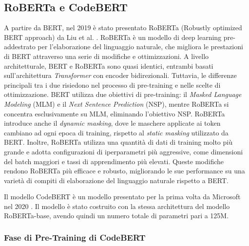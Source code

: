 \documentclass[../../Thesis.tex]{subfiles}
\begin{document}
\subsection{RoBERTa e CodeBERT}
A partire da BERT, nel 2019 è stato presentato RoBERTa (Robustly optimized BERT approach) da Liu et al. \cite{RoBERTa}. RoBERTa è un modello di deep learning pre-addestrato per l'elaborazione del linguaggio naturale, che migliora le prestazioni di BERT attraverso una serie di modifiche e ottimizzazioni. A livello architetturale, BERT e RoBERTa sono quasi identici, entrambi basati sull'architettura \textit{Transformer} con encoder bidirezionali. Tuttavia, le differenze principali tra i due risiedono nel processo di pre-training e nelle scelte di ottimizzazione. BERT utilizza due obiettivi di pre-training: il \textit{Masked Language Modeling} (MLM) e il \textit{Next Sentence Prediction} (NSP), mentre RoBERTa si concentra esclusivamente su MLM, eliminando l'obiettivo NSP. RoBERTa introduce anche il \textit{dynamic masking}, dove le maschere applicate ai token cambiano ad ogni epoca di training, rispetto al \textit{static masking} utilizzato da BERT. Inoltre, RoBERTa utilizza una quantità di dati di training molto più grande e adotta configurazioni di iperparametri più aggressive, come dimensioni del batch maggiori e tassi di apprendimento più elevati. Queste modifiche rendono RoBERTa più efficace e robusto, migliorando le sue performance su una varietà di compiti di elaborazione del linguaggio naturale rispetto a BERT.


Il modello CodeBERT è un modello presentato per la prima volta da Microsoft nel 2020 \cite{CodeBERT}. Il modello è stato costruito con la stessa architettura del modello RoBERTa-base, avendo quindi un numero totale di parametri pari a 125M. 
 

\subsubsection{Fase di Pre-Training di CodeBERT}
\end{document}
